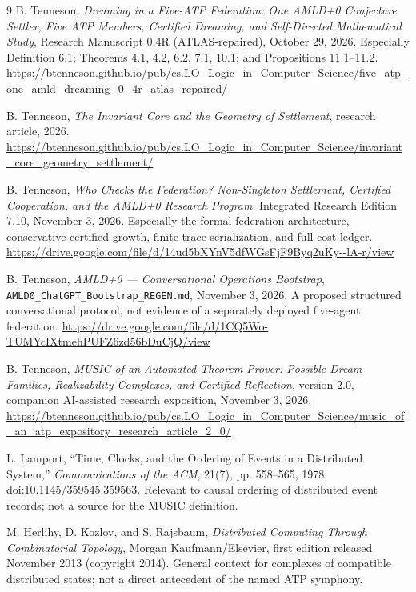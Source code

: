 \documentclass[11pt,letterpaper]{article}
\theoremstyle{definition}
\theoremstyle{remark}
\begin{document}
\begin{thebibliography}{9}
\setlength{\itemsep}{0pt}\setlength{\parsep}{0pt}
B. Tenneson, \emph{Dreaming in a Five-ATP Federation: One AMLD+0 Conjecture Settler, Five ATP Members, Certified Dreaming, and Self-Directed Mathematical Study}, Research Manuscript 0.4R (ATLAS-repaired), October 29, 2026. Especially Definition 6.1; Theorems 4.1, 4.2, 6.2, 7.1, 10.1; and Propositions 11.1--11.2.\newline
\footnotesize\url{https://btenneson.github.io/pub/cs.LO_Logic_in_Computer_Science/five_atp_one_amld_dreaming_0_4r_atlas_repaired/}\normalsize

B. Tenneson, \emph{The Invariant Core and the Geometry of Settlement}, research article, 2026.\newline
\footnotesize\url{https://btenneson.github.io/pub/cs.LO_Logic_in_Computer_Science/invariant_core_geometry_settlement/}\normalsize

B. Tenneson, \emph{Who Checks the Federation? Non-Singleton Settlement, Certified Cooperation, and the AMLD+0 Research Program}, Integrated Research Edition 7.10, November 3, 2026. Especially the formal federation architecture, conservative certified growth, finite trace serialization, and full cost ledger.\newline
\footnotesize\url{https://drive.google.com/file/d/14ud5bXYnV5dfWGsFjF9Byq2uKy--lA-r/view}\normalsize

B. Tenneson, \emph{AMLD+0 --- Conversational Operations Bootstrap}, \texttt{AMLD0\_ChatGPT\_Bootstrap\_REGEN.md}, November 3, 2026. A proposed structured conversational protocol, not evidence of a separately deployed five-agent federation.\newline
\footnotesize\url{https://drive.google.com/file/d/1CQ5Wo-TUMYcIXtmehPUFZ6zd56bDuCjQ/view}\normalsize

B. Tenneson, \emph{MUSIC of an Automated Theorem Prover: Possible Dream Families, Realizability Complexes, and Certified Reflection}, version 2.0, companion AI-assisted research exposition, November 3, 2026.\newline
\footnotesize\url{https://btenneson.github.io/pub/cs.LO_Logic_in_Computer_Science/music_of_an_atp_expository_research_article_2_0/}\normalsize

L. Lamport, ``Time, Clocks, and the Ordering of Events in a Distributed System,'' \emph{Communications of the ACM}, 21(7), pp. 558--565, 1978, doi:10.1145/359545.359563. Relevant to causal ordering of distributed event records; not a source for the MUSIC definition.

M. Herlihy, D. Kozlov, and S. Rajsbaum, \emph{Distributed Computing Through Combinatorial Topology}, Morgan Kaufmann/Elsevier, first edition released November 2013 (copyright 2014). General context for complexes of compatible distributed states; not a direct antecedent of the named ATP symphony.
\end{thebibliography}
\endgroup
\end{document}
